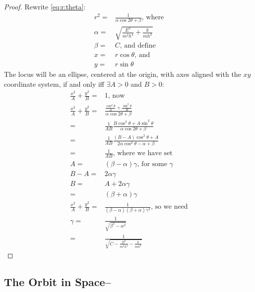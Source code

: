 \documentclass[]{article}
\begin{document}
\begin{proof}
	Rewrite \eqref{eq:r:theta}:
	\begin{align*}
		r^2 =& \frac{1}{\alpha \cos{2\theta} + \beta} \text{, where}\\
		\alpha =& \sqrt{\frac{E^2}{m^2 h^4} +\frac{k}{m h^2}}\\
		\beta =& C \text{, and define}\\
		x =& r \cos{\theta} \text{, and}\\
		y =& r \sin{\theta}
	\end{align*}
	The locus will be an ellipse, centered at the origin, with axes aligned with the $xy$ coordinate system, if and only iff $\exists A>0$ and $B>0 :$
	\begin{align*}
		\frac{x^2}{A}+\frac{y^2}{B}=&1 \text{, now}\\
		\frac{x^2}{A}+\frac{y^2}{B}=&\frac{\frac{\cos^2\theta}{A}+\frac{\sin^2\theta}{B}}{\alpha \cos{2\theta} + \beta}\\
		=&\frac{1}{AB}\frac{B\cos^2\theta+A\sin^2\theta}{\alpha \cos{2\theta} + \beta}\\
		=&\frac{1}{AB}\frac{(B-A)\cos^2\theta + A}{2\alpha \cos^2\theta-\alpha+\beta}\\
		=&\frac{1}{AB} \text{, where we have set}\\
		A =& (\beta-\alpha) \gamma \text{, for some $\gamma$}\\
		B -A=& 2\alpha \gamma\\
		B =& A + 2\alpha \gamma\\
		=& (\beta+\alpha) \gamma\\
		\frac{x^2}{A}+\frac{y^2}{B}=&\frac{1}{(\beta-\alpha) (\beta+\alpha) \gamma^2} \text{, so we need}\\
		\gamma =& \frac{1}{\sqrt{\beta^2 - \alpha^2}}\\
		=& \frac{1}{\sqrt{C - \frac{E^2}{m^2 h^4} - \frac{k}{m h^2}}}
	\end{align*}
\end{proof}
\subsection{The Orbit in Space--\cite[Section 2.8]{ssd}}
\end{document}
